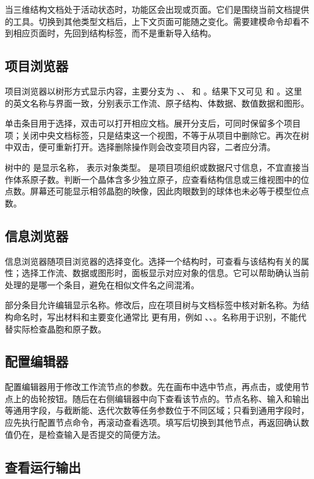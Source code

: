 当三维结构文档处于活动状态时，功能区会出现或页面。它们是围绕当前文档提供的工具。切换到其他类型文档后，上下文页面可能随之变化。需要建模命令却看不到相应页面时，先回到结构标签，而不是重新导入结构。

\subsection{项目浏览器}
项目浏览器以树形方式显示内容，主要分支为 、、 和 。结果下又可见  和 。这里的英文名称与界面一致，分别表示工作流、原子结构、体数据、数值数据和图形。

单击条目用于选择，双击可以打开相应文档。展开分支后，可同时保留多个项目项；关闭中央文档标签，只是结束这一个视图，不等于从项目中删除它。再次在树中双击，便可重新打开。选择删除操作则会改变项目内容，二者应分清。

树中的  是显示名称， 表示对象类型。 是项目项组织或数据尺寸信息，不宜直接当作体系原子数。判断一个晶体含多少独立原子，应查看结构信息或三维视图中的位点数。屏幕还可能显示相邻晶胞的映像，因此肉眼数到的球体也未必等于模型位点数。

\subsection{信息浏览器}
信息浏览器随项目浏览器的选择变化。选择一个结构时，可查看与该结构有关的属性；选择工作流、数据或图形时，面板显示对应对象的信息。它可以帮助确认当前处理的是哪一个条目，避免在相似文件名之间混淆。

部分条目允许编辑显示名称。修改后，应在项目树与文档标签中核对新名称。为结构命名时，写出材料和主要变化通常比  更有用，例如 、、。名称用于识别，不能代替实际检查晶胞和原子数。

\subsection{配置编辑器}
配置编辑器用于修改工作流节点的参数。先在画布中选中节点，再点击，或使用节点上的齿轮按钮。随后在右侧编辑器中向下查看该节点的。节点名称、输入和输出等通用字段，与截断能、迭代次数等任务参数位于不同区域；只看到通用字段时，应先执行配置节点命令，再滚动查看选项。填写后切换到其他节点，再返回确认数值仍在，是检查输入是否提交的简便方法。

\subsection{查看运行输出}

